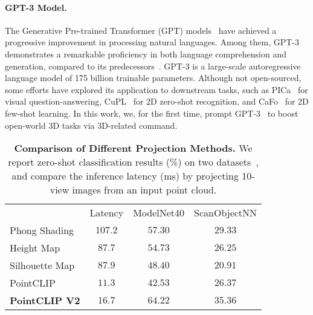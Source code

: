 \documentclass[10pt,twocolumn,letterpaper]{article}
\begin{document}
\paragraph{GPT-3 Model.} The Generative Pre-trained Transformer (GPT) models~\cite{radford2018improving, radford2019language, brown2020language} have achieved a progressive improvement in processing natural languages. Among them, GPT-3 demonstrates a remarkable proficiency in both language comprehension and generation, compared to its predecessors~\cite{radford2018improving, radford2019language, liu2019roberta, yang2019xlnet, raffel2020exploring}. GPT-3 is a large-scale autoregressive language model of 175 billion trainable parameters. Although not open-sourced, some efforts have explored its application to downstream tasks, such as PICa~\cite{yang2022empirical} for visual question-answering, CuPL~\cite{pratt2022Whatdoes} for 2D zero-shot recognition, and CaFo~\cite{zhang2023prompt} for 2D few-shot learning. In this work, we, for the first time, prompt GPT-3~\cite{brown2020language} to boost open-world 3D tasks via 3D-related command.

\begin{table}[t!]
\centering
\begin{adjustbox}{width=0.9\linewidth}
	\begin{tabular}{lccc}
	\toprule
		\makecell*[c]{Method} & Latency & ModelNet40 & ScanObjectNN \\ \cmidrule(lr){1-1} \cmidrule(lr){2-2} \cmidrule(lr){3-4}
		Phong Shading~\cite{su2015multi} & $107.2$ & $57.30$ & $29.33$\\
		Height Map~\cite{su2018adeeper} & $87.7$ & $54.73$ & $26.25$\\
		Silhouette Map~\cite{su2018adeeper} & $87.9$ & $48.40$ & $20.91$ \\
		PointCLIP~\cite{zhang2022pointclip} & $\mathbf{11.3}$ & $42.53$ & $26.37$\\
		\textbf{PointCLIP V2} & $16.7$ & $\mathbf{64.22}$ & $\mathbf{35.36}$\\
	\bottomrule
	\end{tabular}
\end{adjustbox}
\vspace{0.23cm}
\caption{\textbf{Comparison of Different Projection Methods.}
We report zero-shot classification results (\%) on two datasets~\cite{wu20153d, uy2019revisiting}, and compare the inference latency (ms) by projecting 10-view images from an input point cloud.}
\label{table:ablation_projection}
\vspace{-0.2cm}
\end{table}
\end{document}
